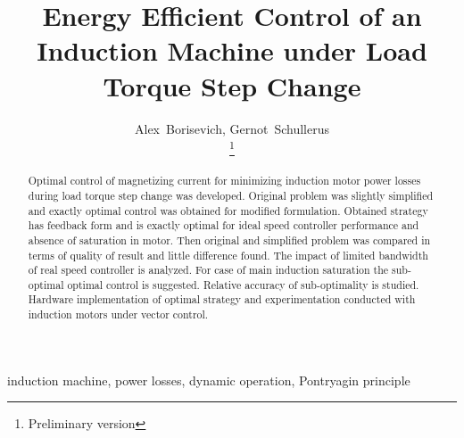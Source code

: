 \documentclass[journal]{IEEEtran}
\begin{document}
\title{Energy Efficient Control of an Induction Machine under Load Torque Step Change}



\author { Alex~Borisevich,
Gernot~Schullerus

\thanks{Preliminary version}}























\maketitle


\begin{abstract}

Optimal control of magnetizing current for minimizing induction motor power losses during load torque step change was developed. Original problem was slightly simplified and exactly optimal control was obtained for modified formulation. Obtained strategy has feedback form and is exactly optimal for ideal speed controller performance and absence of saturation in motor. Then original and simplified problem was compared in terms of quality of result and little difference found. The impact of limited bandwidth of real speed controller is analyzed. For case of main induction saturation the sub-optimal optimal control is suggested. Relative accuracy of sub-optimality is studied. Hardware implementation of optimal strategy and experimentation conducted with induction motors under vector control.

\end{abstract}


\begin{IEEEkeywords}
induction machine, power losses, dynamic operation, Pontryagin principle 
\end{IEEEkeywords}






\IEEEpeerreviewmaketitle
\end{document}
